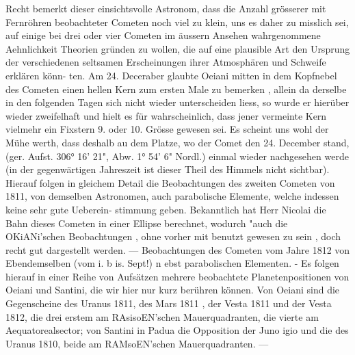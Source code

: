 \documentclass[12pt,a4paper]{article}
\begin{document}
Recht bemerkt dieser einsichtsvolle Astronom, dass die Anzahl grösserer mit Fernröhren beobachteter\newline
Cometen noch viel zu klein, uns es daher zu misslich sei, auf einige bei drei oder vier Cometen im\newline
äussern Ansehen wahrgenommene Aehnlichkeit Theorien gründen zu wollen, die auf eine plausible Art\newline
den Ursprung der verschiedenen seltsamen Erscheinungen ihrer Atmosphären und Schweife erklären könn-\newline
ten. Am 24. Deceraber glaubte Oeiani mitten in dem Kopfnebel des Cometen einen hellen Kern zum\newline
ersten Male zu bemerken , allein da derselbe in den folgenden Tagen sich nicht wieder unterscheiden\newline
liess, so wurde er hierüber wieder zweifelhaft und hielt es für wahrscheinlich, dass jener vermeinte\newline
Kern vielmehr ein Fixstern 9. oder 10. Grösse gewesen sei. Es scheint uns wohl der Mühe werth, dass\newline
deshalb au dem Platze, wo der Comet den 24. December stand, (ger. Aufst. 306° 16' 21", Abw. 1° 54' 6"\newline
Nordl.) einmal wieder nachgesehen werde (in der gegenwärtigen Jahreszeit ist dieser Theil des Himmels\newline
nicht sichtbar). Hierauf folgen in gleichem Detail die Beobachtungen des zweiten Cometen von 1811,\newline
von demselben Astronomen, auch parabolische Elemente, welche indessen keine sehr gute Ueberein-\newline
stimmung geben. Bekanntlich hat Herr Nicolai die Bahn dieses Cometen in einer Ellipse berechnet,\newline
wodurch "auch die OKiANi'schen Beobachtungen , ohne vorher mit benutzt gewesen zu sein , doch recht\newline
gut dargestellt werden. --- Beobachtungen des Cometen vom Jahre 1812 von Ebendemselben (vom i. b is. Sept!) n ebst parabolischen Elementen. - Es folgen hierauf in einer Reihe von Aufsätzen mehrere\newline
beobachtete Planetenpositionen von Oeiani und Santini, die wir hier nur kurz berühren können. Von\newline
Oeiani sind die Gegenscheine des Uranus 1811, des Mars 1811 , der Vesta 1811 und der Vesta 1812, die\newline
drei erstem am RAsisoEN'schen Mauerquadranten, die vierte am Aequatorealsector; von Santini in Padua\newline
die Opposition der Juno igio und die des Uranus 1810, beide am RAMsoEN'schen Mauerquadranten. ---\newline
\end{document}
